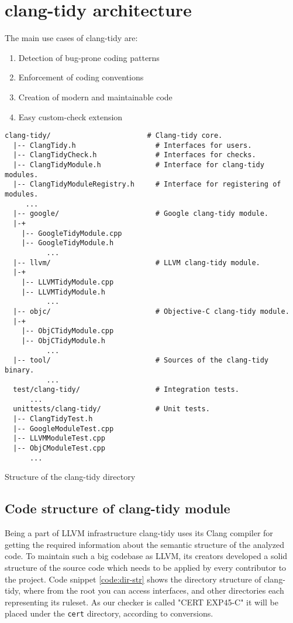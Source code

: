 \section{clang-tidy architecture}

The main use cases of clang-tidy are:

\begin{enumerate}
    \item Detection of bug-prone coding patterns
    \item Enforcement of coding conventions
    \item Creation of modern and maintainable code
    \item Easy custom-check extension
\end{enumerate}

\begin{listing}[!b]
\begin{verbatim}
clang-tidy/                       # Clang-tidy core.
  |-- ClangTidy.h                   # Interfaces for users.
  |-- ClangTidyCheck.h              # Interfaces for checks.
  |-- ClangTidyModule.h             # Interface for clang-tidy modules.
  |-- ClangTidyModuleRegistry.h     # Interface for registering of modules.
     ...
  |-- google/                       # Google clang-tidy module.
  |-+
    |-- GoogleTidyModule.cpp
    |-- GoogleTidyModule.h
          ...
  |-- llvm/                         # LLVM clang-tidy module.
  |-+
    |-- LLVMTidyModule.cpp
    |-- LLVMTidyModule.h
          ...
  |-- objc/                         # Objective-C clang-tidy module.
  |-+
    |-- ObjCTidyModule.cpp
    |-- ObjCTidyModule.h
          ...
  |-- tool/                         # Sources of the clang-tidy binary.
          ...
  test/clang-tidy/                  # Integration tests.
      ...
  unittests/clang-tidy/             # Unit tests.
  |-- ClangTidyTest.h
  |-- GoogleModuleTest.cpp
  |-- LLVMModuleTest.cpp
  |-- ObjCModuleTest.cpp
      ...
\end{verbatim}
\caption{Structure of the clang-tidy directory}
\label{code:dir-str}
\end{listing}

\subsection{Code structure of clang-tidy module}

Being a part of LLVM infrastructure clang-tidy uses its Clang compiler for getting the required information about the semantic structure of the analyzed code. To maintain such a big codebase as LLVM, its creators developed a solid structure of the source code which needs to be applied by every contributor to the project. Code snippet \ref{code:dir-str} shows the directory structure of clang-tidy, where from the root you can access interfaces, and other directories each representing its ruleset. As our checker is called "CERT EXP45-C" it will be placed under the \lstinline{cert} directory, according to conversions. 


